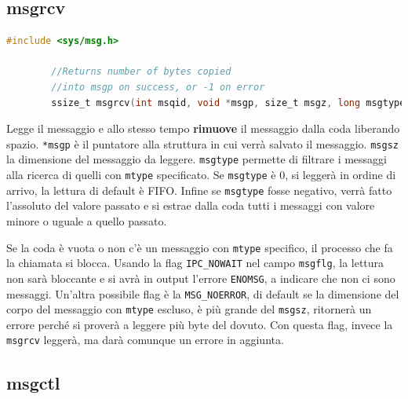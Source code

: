 \documentclass[a4paper, 12pt]{book}
\begin{document}
    \subsection{msgrcv}

    \begin{lstlisting}[language=C]
        #include <sys/msg.h>

        //Returns number of bytes copied
        //into msgp on success, or -1 on error 
        ssize_t msgrcv(int msqid, void *msgp, size_t msgz, long msgtype, int msgflg);
    \end{lstlisting}
    Legge il messaggio e allo stesso tempo \textbf{rimuove} 
    il messaggio dalla coda liberando spazio.
    \verb|*msgp| è il puntatore alla struttura in cui 
    verrà salvato il messaggio. \verb|msgsz| la dimensione
    del messaggio da leggere. \verb|msgtype| permette di 
    filtrare i messaggi alla ricerca di quelli con \verb|mtype| 
    specificato. Se \verb|msgtype| è 0, si leggerà in ordine 
    di arrivo, la lettura di default è FIFO. Infine se
    \verb|msgtype| fosse negativo, verrà fatto l'assoluto 
    del valore passato e si estrae dalla coda tutti i 
    messaggi con valore minore o uguale a quello passato.
    
    Se la coda è vuota o non c'è un messaggio con 
    \verb|mtype| specifico, il processo che 
    fa la chiamata si blocca. Usando la flag \verb|IPC_NOWAIT|
    nel campo \verb|msgflg|, la lettura non sarà bloccante 
    e si avrà in output l'errore \verb|ENOMSG|, a indicare 
    che non ci sono messaggi. Un'altra possibile flag 
    è la \verb|MSG_NOERROR|, di default se la dimensione 
    del corpo del messaggio con \verb|mtype| escluso, è 
    più grande del \verb|msgsz|, ritornerà un errore 
    perché si proverà a leggere più byte del dovuto. Con 
    questa flag, invece la \verb|msgrcv| 
    leggerà, ma darà comunque un errore in aggiunta.
    
    \subsection{msgctl}
\end{document}
